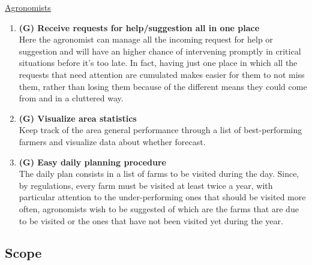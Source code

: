 \documentclass[table, 12pt]{article}
\begin{document}
\underline{Agronomists}
\begin{enumerate}
    \item \textbf{(G) Receive requests for help/suggestion all in one place}\\
    Here the agronomist can manage all the incoming request for help or suggestion and will have an higher chance of intervening promptly in critical situations before it's too late. In fact, having just one place in which all the requests that need attention are cumulated makes easier for them to not miss them, rather than losing them because of the different means they could come from and in a cluttered way.
    \item \textbf{(G) Visualize area statistics}\\
    Keep track of the area general performance through a list of best-performing farmers and visualize data about whether forecast.
    \item \textbf{(G) Easy daily planning procedure}\\
    The daily plan consists in a list of farms to be visited during the day.
    Since, by regulations, every farm must be visited at least twice a year, with particular attention to the under-performing ones that should be visited more often, agronomists wish to be suggested of which are the farms that are due to be visited or the ones that have not been visited yet during the year.
\end{enumerate}

\subsection{Scope} %
\end{document}
